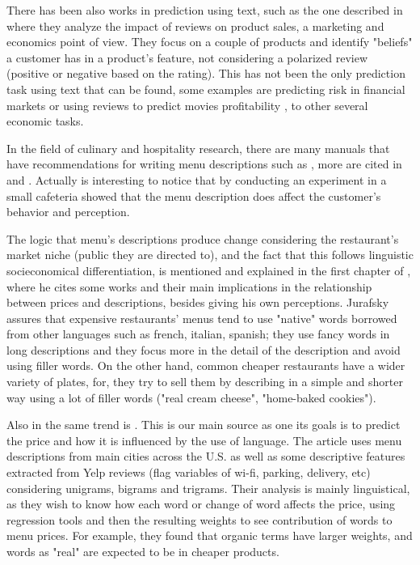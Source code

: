 \documentclass[11pt,letterpaper]{article}
\begin{document}
There has been also works in prediction using text, such as the one described in \cite{archak2011deriving} where they analyze the impact of reviews on product sales, a marketing and economics point of view. They focus on a couple of products and identify "beliefs" a customer has in a product's feature, not considering a polarized review (positive or negative based on the rating). This has not been the only prediction task using text that can be found, some examples are predicting risk in financial markets or using reviews to predict movies profitability \cite{joshi2010movie}, to other several economic tasks. 

In the field of culinary and hospitality research, there are many manuals that have recommendations for writing menu descriptions  such as \cite{kasavana1990menu}, more are cited in \cite{chahuneau2012word} and \cite{jurafsky2014language} . Actually is interesting to notice that by conducting an experiment in a small cafeteria \cite{wansink2005descriptive} showed that the menu description does affect the customer's behavior and perception.

The logic that menu's descriptions produce change considering the restaurant's market niche (public they are directed to), and the fact that this follows linguistic socieconomical differentiation, is mentioned and explained in the first chapter of \cite{jurafsky2014language}, where he cites some works and their main implications in the relationship between prices and descriptions, besides giving his own perceptions. Jurafsky assures that expensive restaurants' menus tend to use "native" words borrowed from other languages such as french, italian, spanish; they use fancy words in long descriptions and they focus more in the detail of the description and avoid using filler words. On the other hand, common cheaper restaurants have a wider variety of plates, for, they try to sell them by describing in a simple and shorter way using a lot of filler words ("real cream cheese", "home-baked cookies"). 

Also in the same trend is \cite{chahuneau2012word}. This is our main source as one its goals is to predict the price and how it is influenced by the use of language. The article uses menu descriptions from main cities across the U.S. as well as some descriptive features extracted from Yelp reviews (flag variables of wi-fi, parking, delivery, etc) considering unigrams, bigrams and trigrams. Their analysis is mainly linguistical, as they wish to know how each word or change of word affects the price, using regression tools and then the resulting weights to see contribution of words to menu prices. For example, they found that organic terms have larger weights, and words as "real" are expected to be in cheaper products.
\end{document}
